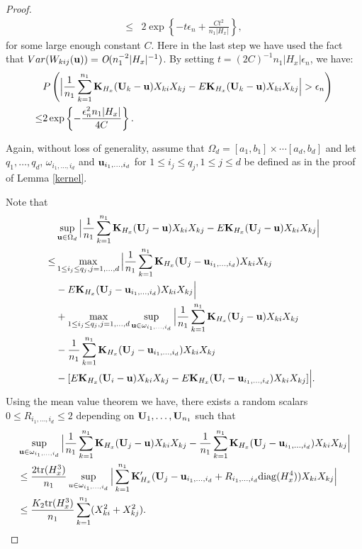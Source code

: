 \documentclass[11pt]{article}
\theoremstyle{definition}
\begin{document}
\begin{proof}
\begin{align}
 		\leq& 2\exp\left\{-t\epsilon_n+\frac{Ct^2}{n_1|H_x|}\right\},\nonumber
 	\end{align}
 	for some large enough constant $C$. Here in the last step we have used the fact that $Var(W_{kij}({\bf u}))=\emph{O}(n_1^{-2}|H_x|^{-1})$.
 	By setting $t=(2C)^{-1}n_1|H_x|\epsilon_n$, we have:
 	\begin{align}\label{lemma3.3}
 		&P\left(\Big|\frac{1}{n_1}\sum_{k=1}^{n_1}{\bf K}_{H_x}({\bf U}_k-{\bf u})X_{ki}X_{kj}-E{\bf K}_{H_x}({\bf U}_k-{\bf u})X_{ki}X_{kj}\Big|>\epsilon_n \right)   \\
 		\leq& 2\exp\left\{-\frac{\epsilon_n^2n_1|H_x|}{4C}\right\}.\nonumber
 	\end{align}
 	
 	Again, without loss of generality, assume that $\Omega_d=[a_1,b_1]\times\cdots[a_d,b_d]$ and let $q_1,\ldots,q_d$,  $\omega_{i_1,\ldots,i_d}$ and ${\bf u}_{i_1,\ldots,i_d}$ for $1\leq i_j\leq q_j, 1\leq j\leq d$ be defined as in the proof of Lemma \ref{kernel}.
 	
 	Note that
 	\begin{align}\label{lemma3.4}
 		&\sup_{{\bf u}\in \Omega_d}\Big|\frac{1}{n_1}\sum_{k=1}^{n_1}{\bf K}_{H_x}({\bf U}_j-{\bf u})X_{ki}X_{kj}-E{\bf K}_{H_x}({\bf U}_j-{\bf u})X_{ki}X_{kj}\Big|  \\
 		\leq&
 		\max_{1\leq i_j \leq q_j, j=1,\ldots,d}\Big|\frac{1}{n_1}\sum_{k=1}^{n_1}{\bf K}_{H_x}({\bf U}_j-{\bf u}_{i_1,\ldots,i_d})X_{ki}X_{kj} \nonumber \\
 		&-E{\bf K}_{H_x}({\bf U}_j-{\bf u}_{i_1,\ldots,i_d})X_{ki}X_{kj}\Big| \nonumber\\
 		&+\max_{1\leq i_j \leq q_j, j=1,\ldots,d}\sup_{{\bf u}\in\omega_{i_1,\ldots,i_d}}\Big|\frac{1}{n_1}\sum_{k=1}^{n_1}{\bf K}_{H_x}({\bf U}_j-{\bf u})X_{ki}X_{kj}\nonumber \\
 		&-\frac{1}{n_1}\sum_{k=1}^{n_1}{\bf K}_{H_x}({\bf U}_j- {\bf u}_{i_1,\ldots,i_d})X_{ki}X_{kj}  \nonumber\\
 		&-[E{\bf K}_{H_x}({\bf U}_i-{\bf u})X_{ki}X_{kj}-E{\bf K}_{H_x}({\bf U}_i-{\bf u}_{i_1,\ldots,i_d})X_{ki}X_{kj}] \Big|.\nonumber
 	\end{align}
 	Using the mean value theorem we have, there exists a random scalars $0\leq R_{i_1,\ldots,i_d}\leq 2$ depending on ${\bf U}_1,\ldots, {\bf U}_{n_1}$ such that
 	\begin{align*}
 		&\sup_{{\bf u}\in\omega_{i_1,\ldots,i_d}}\Big|\frac{1}{n_1}\sum_{k=1}^{n_1}{\bf K}_{H_x}({\bf U}_j-{\bf u})X_{ki}X_{kj}-\frac{1}{n_1}\sum_{k=1}^{n_1}{\bf K}_{H_x}({\bf U}_j-{\bf u}_{i_1,\ldots,i_d})X_{ki}X_{kj} \Big|  \nonumber\\
 		&\leq \frac{2{\rm tr}(H^3_x)}{n_1} \sup_{u\in\omega_{i_1,\ldots,i_d}}\Big|\sum_{k=1}^{n_1}{\bf K}'_{H_x}({\bf U}_j-{\bf u}_{i_1,\ldots,i_d}+R_{i_1,\ldots,i_d}{\rm diag}(H_x^4))X_{ki}X_{kj}  \Big| \nonumber\\
 		&\leq\frac{ K_2{\rm tr}(H^3_x)}{n_1}\sum_{k=1}^{n_1}(X_{ki}^2+X_{kj}^2).
 	\end{align*}
 	

\end{proof}
\end{document}
